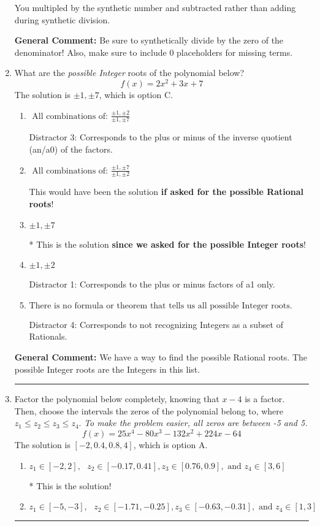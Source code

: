 \documentclass{extbook}[14pt]
\newcommand{\litem}[1]{\item #1

\rule{\textwidth}{0.4pt}}
\begin{document}
\begin{enumerate}
{\begin{enumerate}[label=\Alph*.]
 You multipled by the synthetic number and subtracted rather than adding during synthetic division.
\end{enumerate}

\textbf{General Comment:} Be sure to synthetically divide by the zero of the denominator! Also, make sure to include 0 placeholders for missing terms.
}
\litem{
What are the \textit{possible Integer} roots of the polynomial below?
\[ f(x) = 2x^{2} +3 x + 7 \]The solution is \( \pm 1,\pm 7 \), which is option C.\begin{enumerate}[label=\Alph*.]
\item \( \text{ All combinations of: }\frac{\pm 1,\pm 2}{\pm 1,\pm 7} \)

 Distractor 3: Corresponds to the plus or minus of the inverse quotient (an/a0) of the factors. 
\item \( \text{ All combinations of: }\frac{\pm 1,\pm 7}{\pm 1,\pm 2} \)

This would have been the solution \textbf{if asked for the possible Rational roots}!
\item \( \pm 1,\pm 7 \)

* This is the solution \textbf{since we asked for the possible Integer roots}!
\item \( \pm 1,\pm 2 \)

 Distractor 1: Corresponds to the plus or minus factors of a1 only.
\item \( \text{There is no formula or theorem that tells us all possible Integer roots.} \)

 Distractor 4: Corresponds to not recognizing Integers as a subset of Rationals.
\end{enumerate}

\textbf{General Comment:} We have a way to find the possible Rational roots. The possible Integer roots are the Integers in this list.
}
\litem{
Factor the polynomial below completely, knowing that $x -4$ is a factor. Then, choose the intervals the zeros of the polynomial belong to, where $z_1 \leq z_2 \leq z_3 \leq z_4$. \textit{To make the problem easier, all zeros are between -5 and 5.}
\[ f(x) = 25x^{4} -80 x^{3} -132 x^{2} +224 x -64 \]The solution is \( [-2, 0.4, 0.8, 4] \), which is option A.\begin{enumerate}[label=\Alph*.]
\item \( z_1 \in [-2, 2], \text{   }  z_2 \in [-0.17, 0.41], z_3 \in [0.76, 0.9], \text{   and   } z_4 \in [3, 6] \)

* This is the solution!
\item \( z_1 \in [-5, -3], \text{   }  z_2 \in [-1.71, -0.25], z_3 \in [-0.63, -0.31], \text{   and   } z_4 \in [1, 3] \)


\end{enumerate}}
\end{enumerate}
\end{document}
